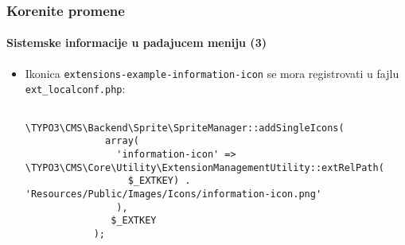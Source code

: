 \begin{frame}[fragile]
	\frametitle{Korenite promene}
	\framesubtitle{Sistemske informacije u padajucem meniju (3)}

	\lstset{basicstyle=\tiny\ttfamily}

	\begin{itemize}
		\item Ikonica \texttt{extensions-example-information-icon} se mora registrovati u fajlu \texttt{ext\_localconf.php}:
		\begin{lstlisting}
			\TYPO3\CMS\Backend\Sprite\SpriteManager::addSingleIcons(
			  array(
			    'information-icon' => \TYPO3\CMS\Core\Utility\ExtensionManagementUtility::extRelPath(
			      $_EXTKEY) . 'Resources/Public/Images/Icons/information-icon.png'
			    ),
			   $_EXTKEY
			);
		\end{lstlisting}

	\end{itemize}

\end{frame}


